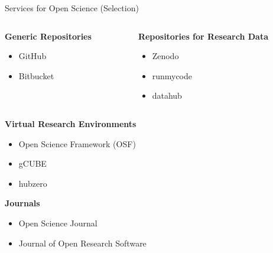 \documentclass{intbeamer}
\begin{document}
\begin{frame}{Services for Open Science (Selection)}

\begin{columns}[T]
\begin{column}{.45\linewidth}
\textbf{Generic Repositories}
\begin{itemize}
\item GitHub
\item Bitbucket
\end{itemize}
\end{column}
%
\begin{column}{.45\linewidth}
\textbf{Repositories for Research Data}
\begin{itemize}
\item Zenodo
\item runmycode
\item datahub
\end{itemize}
\end{column}
\end{columns}

\vfill

\textbf{Virtual Research Environments}
\begin{itemize}
\item Open Science Framework (OSF)
\item gCUBE
\item hubzero
\end{itemize}

\vfill

\textbf{Journals}
\begin{itemize}
\item Open Science Journal
\item Journal of Open Research Software
\end{itemize}

\end{frame}
\end{document}
